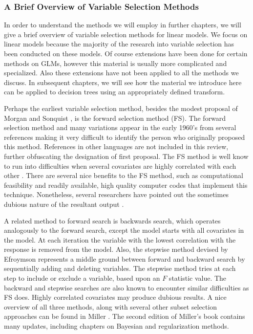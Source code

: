 \subsubsection{A Brief Overview of Variable Selection Methods}

In order to understand the methods we will employ in further chapters, we will give a brief overview of variable selection methods for linear models. We focus on linear models because the majority of the research into variable selection has been conducted on these models. Of course extensions have been done for certain methods on GLMs, however this material is usually more complicated and specialized. Also these extensions have not been applied to all the methods we discuss. In subsequent chapters, we will see how the material we introduce here can be applied to decision trees using an appropriately defined transform. 

Perhaps the earliest variable selection method, besides the modest proposal of Morgan and Sonquist \cite{morgan1963problems}, is the forward selection method (FS). The forward selection method and many variations appear in the early 1960's from several references making it very difficult to identify the person who originally proposed this method. References in other languages are not included in this review, further obfuscating the designation of first proposal. The FS method is well know to run into difficulties when several covariates  are highly correlated with each other \cite{miller1984selection}. There are several nice benefits to the FS method, such as computational feasibility and readily available, high quality computer codes that implement this technique. Nonetheless, several researchers have pointed out the sometimes dubious nature of the resultant output \cite{halvorson1960regression}. 

A related method to forward search is backwards search, which operates analogously to the forward search, except the model starts with all covariates in the model. At each iteration the variable with the lowest correlation with the response is removed from the model. Also, the stepwise method devised by Efroymson \cite{efroymson1960multiple} represents a middle ground between forward and backward search by sequentially adding and deleting variables. The stepwise method tries at each step to include or exclude a variable, based upon an $F$ statistic value. The backward and stepwise searches are also known to encounter similar difficulties as FS \cite{miller2002subset} does. Highly correlated covariates may produce dubious results. A nice overview of all three methods, along with several other subset selection approaches can be found in Miller \cite{miller2002subset}. The second edition of Miller's book contains many updates, including chapters on Bayesian and regularization methods.  

